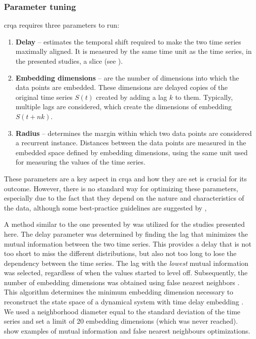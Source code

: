 \subsubsection{Parameter tuning}
\label{subsubsec:parameters_crqa}

\Ac{crqa} requires three parameters to run:

\begin{enumerate}
	\item \textbf{Delay} -- estimates the temporal shift required to make the two time series maximally aligned.
	It is measured by the same time unit as the time series, in the presented studies, a slice (see ).
	
	\item \textbf{Embedding dimensions} -- are the number of dimensions into which the data points are embedded.
	These dimensions are delayed copies of the original time series $S(t)$ created by adding a lag $k$ to them.
	Typically, multiple lags are considered, which create the dimensions of embedding $S(t + nk)$.
	
	\item \textbf{Radius} -- determines the margin within which two data points are considered a recurrent instance.
	Distances between the data points are measured in the embedded space defined by embedding dimensions, using the same unit used for measuring the values of the time series.
\end{enumerate}
%
These parameters are a key aspect in \ac{crqa} and how they are set is crucial for its outcome.
However, there is no standard way for optimizing these parameters, especially due to the fact that they depend on the nature and characteristics of the data, although some best-practice guidelines are suggested by \citet{Coco2014crqa-r},

A method similar to the one presented by \citet{Marwan2007recurrence} was utilized for the studies presented here.
The delay parameter was determined by finding the lag that minimizes the mutual information between the two time series.
This provides a delay that is not too short to miss the different distributions, but also not too long to lose the dependency between the time series.
The lag with the \emph{lowest} mutual information was selected, regardless of when the values started to level off.
Subsequently, the number of embedding dimensions was obtained using false nearest neighbors \citep{Kennel1992determining}.
This algorithm determines the minimum embedding dimension necessary to reconstruct the state space of a dynamical system with time delay embedding \citep{Abarbanel1993local}.
We used a neighborhood diameter equal to the standard deviation of the time series and set a limit of 20 embedding dimensions (which was never reached).
 show examples of mutual information and false nearest neighbours optimizations.

